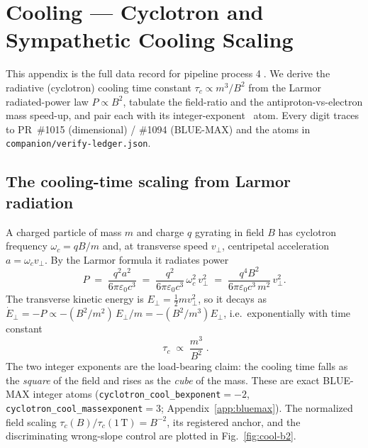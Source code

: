 \section{Cooling --- Cyclotron and Sympathetic Cooling Scaling}
\label{app:cooling}

This appendix is the full data record for pipeline process
\textcircled{\scriptsize 4}. We derive the radiative (cyclotron) cooling time
constant $\tau_c\propto m^3/B^2$ from the Larmor radiated-power law
$P\propto B^2$, tabulate the field-ratio and the antiproton-vs-electron mass
speed-up, and pair each with its integer-exponent \tierBlue\ atom. Every
digit traces to PR~\#1015 (dimensional) / \#1094 (BLUE-MAX) and the atoms in
\texttt{companion/verify-ledger.json}.

\subsection{The cooling-time scaling from Larmor radiation}
\label{app:cool-deriv}

A charged particle of mass $m$ and charge $q$ gyrating in field $B$ has
cyclotron frequency $\omega_c=qB/m$ and, at transverse speed $v_\perp$,
centripetal acceleration $a=\omega_c v_\perp$. By the Larmor formula it
radiates power
\begin{equation}
P \;=\; \frac{q^2 a^2}{6\pi\varepsilon_0 c^3}
   \;=\; \frac{q^2}{6\pi\varepsilon_0 c^3}\,\omega_c^2\,v_\perp^2
   \;=\; \frac{q^4 B^2}{6\pi\varepsilon_0 c^3\, m^2}\,v_\perp^2 .
\label{eq:cool-larmor}
\end{equation}
The transverse kinetic energy is $E_\perp=\tfrac12 m v_\perp^2$, so it decays
as $\dot E_\perp = -P \propto -(B^2/m^2)\,E_\perp/m = -(B^2/m^3)E_\perp$,
i.e.\ exponentially with time constant
\begin{equation}
\boxed{\;\tau_c \;\propto\; \frac{m^3}{B^{2}}\;}.
\label{eq:cool-tau}
\end{equation}
The two integer exponents are the load-bearing claim: the cooling time falls
as the \emph{square} of the field and rises as the \emph{cube} of the mass.
These are exact BLUE-MAX integer atoms
(\verb|cyclotron_cool_bexponent|$=-2$, \verb|cyclotron_cool_massexponent|$=3$;
Appendix~\ref{app:bluemax}). The normalized field scaling
$\tau_c(B)/\tau_c(1\,\mathrm{T})=B^{-2}$, its registered anchor, and the
discriminating wrong-slope control are plotted in Fig.~\ref{fig:cool-b2}.

